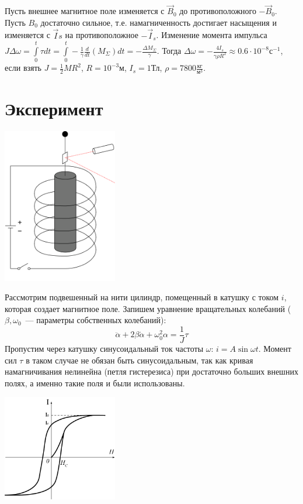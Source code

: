 \documentclass[a4paper]{article}
\begin{document}
Пусть внешнее магнитное поле изменяется с $\vec{B}_0$ до противоположного $-\vec{B}_0$. Пусть $B_0$ достаточно сильное, т.е. намагниченность достигает насыщения и изменяется с $\vec{I}s$ на противоположное $-\vec{I}_s$. Изменение момента импульса $J\Delta \omega=\int\limits_0^t\tau dt=\int\limits_0^t -\frac{1}{\gamma}\frac{d}{dt}(M_\Sigma) dt=-\frac{\Delta M_\Sigma}{\gamma}$. Тогда $\Delta\omega=-\frac{4I_s}{\gamma\rho R^2}\approx 0.6\cdot 10^{-8}\mbox{с}^{-1}$, если взять $J=\frac{1}{2}MR^2$, $R=10^{-3}\mbox{м}$, $I_s=1\mbox{Тл}$, $\rho=7800\frac{\mbox{кг}}{\mbox{м}^3}$.
\newpage
\section*{Эксперимент}
\begin{center}
\includegraphics[width=5cm]{lab.png}
\end{center}
Рассмотрим подвешенный на нити цилиндр, помещенный в катушку с током $i$, которая создает магнитное поле. Запишем уравнение вращательных колебаний ($\beta,\omega_0$~--- параметры собственных колебаний):
$$\ddot{\alpha}+2\beta\dot{\alpha}+\omega_0^2\alpha=\frac{1}{J}\tau$$
Пропустим через катушку синусоидальный ток частоты $\omega$: $i=A\sin\omega t$. Момент сил $\tau$ в таком случае не обязан быть синусоидальным, так как кривая намагничивания нелинейна (петля гистерезиса) при достаточно больших внешних полях, а именно такие поля и были использованы.
\begin{center}
\includegraphics[width=5cm]{hyst.png}
\end{center}
\end{document}
